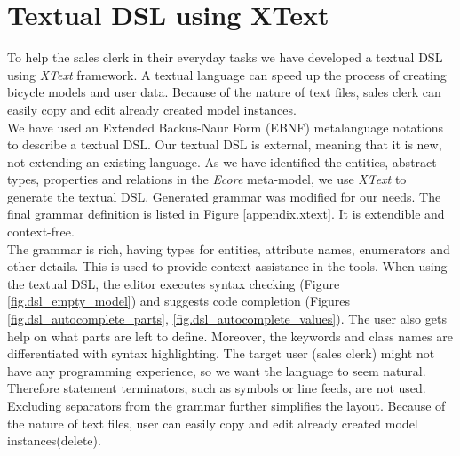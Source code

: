 \section{Textual DSL using XText}
\label{sec.xtext}

\noindent To help the sales clerk in their everyday tasks we have developed a
textual DSL using \emph{XText} framework. A textual language can speed up the
process of creating bicycle models and user data. Because of the nature of text
files,
sales clerk can easily copy and edit already created model instances.\\

\noindent We have used an Extended Backus-Naur Form (EBNF) metalanguage
notations to describe a textual DSL. Our textual DSL is external, meaning that
it is new, not extending an existing language. As we have identified the
entities, abstract types, properties and relations in the \emph{Ecore}
meta-model, we use \emph{XText} to generate the textual DSL. Generated grammar
was modified for our needs. The final grammar definition is listed in Figure
\ref{appendix.xtext}. It is extendible and context-free.\\

\noindent The grammar is rich, having types for entities, attribute names,
enumerators and other details. This is used to provide context assistance in the
tools. When using the textual DSL, the editor executes syntax checking (Figure
\ref{fig.dsl_empty_model}) and suggests code completion (Figures
\ref{fig.dsl_autocomplete_parts}, \ref{fig.dsl_autocomplete_values}). The user
also gets help on what parts are left to define. Moreover, the keywords and
class names are differentiated with syntax highlighting. The target user (sales
clerk) might not have any programming experience, so we want the language to
seem natural. Therefore statement terminators, such as symbols or line feeds,
are not used. Excluding separators from the grammar further simplifies the
layout. Because of the nature of text files, user can easily copy and edit
already created model instances(delete).


